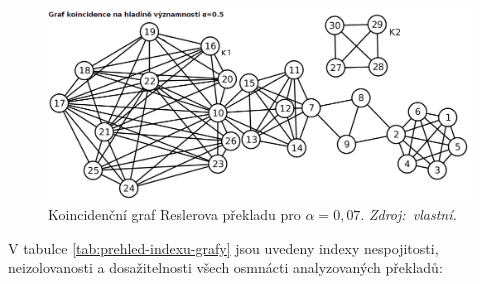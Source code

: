 \documentclass[dp.tex]{subfiles}
\begin{document}
\begin{figure}[H]
	\centering
	\includegraphics[max width=\textwidth,keepaspectratio=true]{imgs-70-prakticka/denotation-resler-05}
	\caption[Koincidenční graf Reslerova překladu pro $\alpha = 0{,}07$.]{Koincidenční graf Reslerova překladu pro $\alpha = 0{,}07$. \textit{Zdroj:~vlastní.}}
	\label{fig:denotation-resler-007}
\end{figure}

V tabulce \ref{tab:prehled-indexu-grafy} jsou uvedeny indexy nespojitosti, neizolovanosti a dosažitelnosti všech osmnácti analyzovaných překladů:
\end{document}
